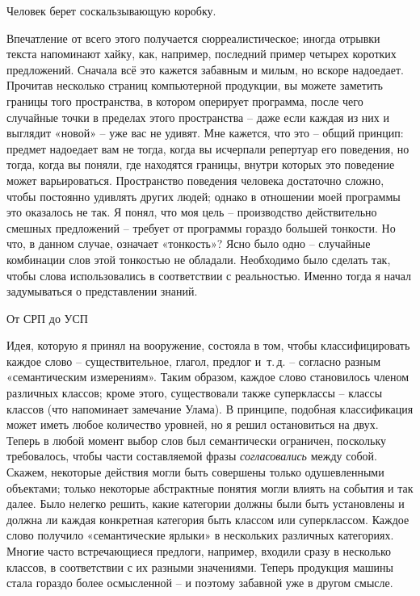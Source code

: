 \documentclass[../main.tex]{subfiles}
\begin{document}
Человек берет соскальзывающую коробку.

Впечатление от всего этого получается сюрреалистическое; иногда отрывки текста напоминают хайку, как, например, последний пример четырех коротких предложений. Сначала всё это кажется забавным и милым, но вскоре надоедает. Прочитав несколько страниц компьютерной продукции, вы можете заметить границы того пространства, в котором оперирует программа, после чего случайные точки в пределах этого пространства \--- даже если каждая из них и выглядит «новой» \--- уже вас не удивят. Мне кажется, что это \--- общий принцип: предмет надоедает вам не тогда, когда вы исчерпали репертуар его поведения, но тогда, когда вы поняли, где находятся границы, внутри которых это поведение может варьироваться. Пространство поведения человека достаточно сложно, чтобы постоянно удивлять других людей; однако в отношении моей программы это оказалось не так. Я понял, что моя цель \--- производство действительно смешных предложений \--- требует от программы гораздо большей тонкости. Но что, в данном случае, означает «тонкость»? Ясно было одно \--- случайные комбинации слов этой тонкостью не обладали. Необходимо было сделать так, чтобы слова использовались в соответствии с реальностью. Именно тогда я начал задумываться о представлении знаний.

От СРП до УСП

Идея, которую я принял на вооружение, состояла в том, чтобы классифицировать каждое слово \--- существительное, глагол, предлог и~т.\,д. \--- согласно разным «семантическим измерениям». Таким образом, каждое слово становилось членом различных классов; кроме этого, существовали также суперклассы \--- классы классов (что напоминает замечание Улама). В принципе, подобная классификация может иметь любое количество уровней, но я решил остановиться на двух. Теперь в любой момент выбор слов был семантически ограничен, поскольку требовалось, чтобы части составляемой фразы \emph{согласовались} между собой. Скажем, некоторые действия могли быть совершены только одушевленными объектами; только некоторые абстрактные понятия могли влиять на события и так далее. Было нелегко решить, какие категории должны были быть установлены и должна ли каждая конкретная категория быть классом или суперклассом. Каждое слово получило «семантические ярлыки» в нескольких различных категориях. Многие часто встречающиеся предлоги, например, входили сразу в несколько классов, в соответствии с их разными значениями. Теперь продукция машины стала гораздо более осмысленной \--- и поэтому забавной уже в другом смысле.
\end{document}
